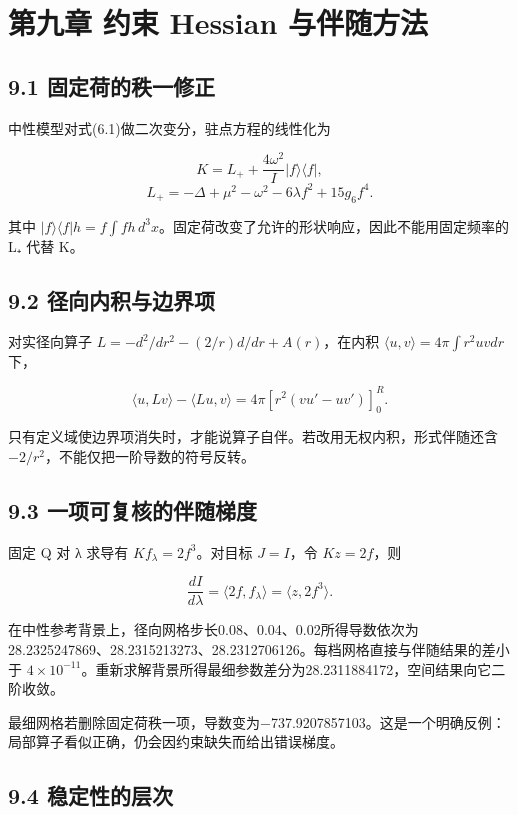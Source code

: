 \documentclass[UTF8,fontset=fandol,11pt]{ctexart}
\begin{document}
\section*{第九章 约束 Hessian 与伴随方法}

\subsection*{9.1 固定荷的秩一修正}

中性模型对式(6.1)做二次变分，驻点方程的线性化为

\[
K=L_++\frac{4\omega^2}{I}|f\rangle\langle f|,
\]
\[
L_+=-\Delta+\mu^2-\omega^2-6\lambda f^2+15g_6f^4.
\tag{9.1}
\]

其中 \(|f\rangle\langle f|h=f\int fh\,d^3x\)。固定荷改变了允许的形状响应，因此不能用固定频率的 L₊ 代替 K。

\subsection*{9.2 径向内积与边界项}

对实径向算子 \(L=-d^2/dr^2-(2/r)d/dr+A(r)\)，在内积 \(\langle u,v\rangle=4\pi\int r^2uvdr\) 下，

\[
\langle u,Lv\rangle-\langle Lu,v\rangle
=4\pi[r^2(vu'-uv')]_0^R.
\tag{9.2}
\]

只有定义域使边界项消失时，才能说算子自伴。若改用无权内积，形式伴随还含 \(-2/r^2\)，不能仅把一阶导数的符号反转。

\subsection*{9.3 一项可复核的伴随梯度}

固定 Q 对 λ 求导有 \(Kf_\lambda=2f^3\)。对目标 \(J=I\)，令 \(Kz=2f\)，则

\[
\frac{dI}{d\lambda}=\langle2f,f_\lambda\rangle
=\langle z,2f^3\rangle.
\tag{9.3}
\]

在中性参考背景上，径向网格步长0.08、0.04、0.02所得导数依次为28.2325247869、28.2315213273、28.2312706126。每档网格直接与伴随结果的差小于 \(4\times10^{-11}\)。重新求解背景所得最细参数差分为28.2311884172，空间结果向它二阶收敛。

最细网格若删除固定荷秩一项，导数变为−737.9207857103。这是一个明确反例：局部算子看似正确，仍会因约束缺失而给出错误梯度。

\subsection*{9.4 稳定性的层次}
\end{document}
